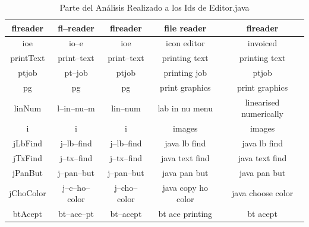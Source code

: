 \begin{table}
\begin{tabular}{| c | c | c | c | c |}
flreader&fl--reader&flreader&file reader&flreader\\ \hline
ioe&io--e&ioe&icon editor&invoiced\\ \hline
printText&print--text&print--text&printing text&printing text\\ \hline
ptjob&pt--job&ptjob&printing job&ptjob\\ \hline
pg&pg&pg&print graphics&print graphics\\ \hline
linNum&l--in--nu--m&lin--num&lab in nu menu&linearised numerically\\ \hline
i&i&i&images&images\\ \hline
jLbFind&j--lb--find&j--lb--find&java lb find&java lb find\\ \hline
jTxFind&j--tx--find&j--tx--find&java text find&java text find\\ \hline
jPanBut&j--pan--but&j--pan--but&java pan but&java pan but\\ \hline
jChoColor&j--c--ho--color&j--cho--color&java copy ho color&java choose color\\ \hline
btAcept&bt--ace--pt&bt--acept&bt ace printing&bt acept\\ \hline

  \end{tabular}
	 
   \caption{Parte del Análisis Realizado a los Ids de Editor.java}
   \label{tabla6}
     
\end{table}

\clearpage %






